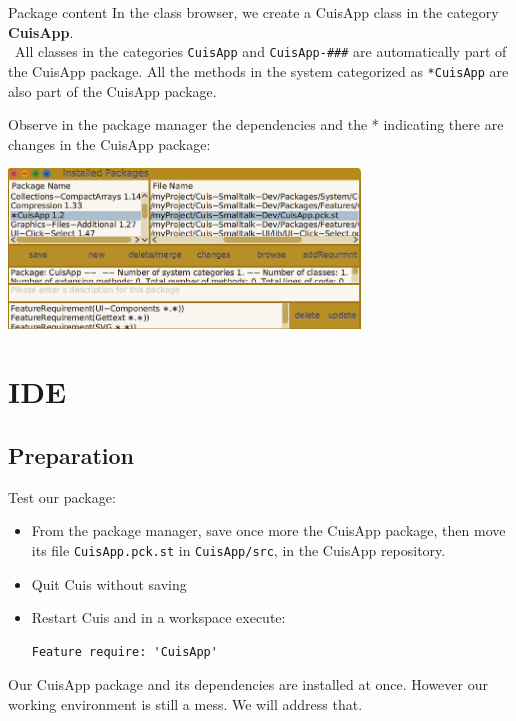\documentclass{beamer}
\newcommand{\tip}{\boldmath{\textcolor{red}{$\Rightarrow$}}}
\begin{document}
\begin{frame}{Package content}
  In the class browser, we create a CuisApp class in the category \textbf{CuisApp}.\\
  \tip\ All classes in the categories \texttt{CuisApp} and
  \texttt{CuisApp-\#\#\#} are automatically part of the CuisApp
  package. All the methods in the system categorized as
  \texttt{*CuisApp} are also part of the CuisApp package.
  \vspace*{10pt}

  Observe in the package manager the dependencies and the * indicating
  there are changes in the CuisApp package:
  \begin{center}
    \includegraphics[width=0.7\textwidth]{CuisAppPackage.png}
  \end{center}
\end{frame}

\section{IDE}
\subsection{Preparation}
\begin{frame}[fragile]
  Test our package:
    \begin{itemize}
    \item From the package manager, save once more the CuisApp
      package, then move its file \texttt{CuisApp.pck.st} in
      \texttt{CuisApp/src}, in the CuisApp repository.
    \item Quit Cuis without saving
    \item Restart Cuis and in a workspace execute:
\begin{lstlisting}[language=Smalltalk]
Feature require: 'CuisApp'
\end{lstlisting}
\end{itemize}
Our CuisApp package and its dependencies are installed at once.
However our working environment is still a mess. We will address that.
\end{frame}
\end{document}
